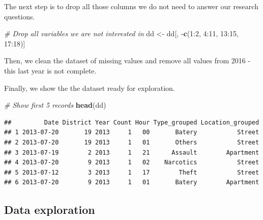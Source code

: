 \documentclass[]{article}
\newenvironment{Shaded}{\begin{snugshade}}{\end{snugshade}}
\newcommand{\KeywordTok}[1]{\textcolor[rgb]{0.13,0.29,0.53}{\textbf{{#1}}}}
\newcommand{\DecValTok}[1]{\textcolor[rgb]{0.00,0.00,0.81}{{#1}}}
\newcommand{\StringTok}[1]{\textcolor[rgb]{0.31,0.60,0.02}{{#1}}}
\newcommand{\CommentTok}[1]{\textcolor[rgb]{0.56,0.35,0.01}{\textit{{#1}}}}
\newcommand{\NormalTok}[1]{{#1}}
\begin{document}
The next step is to drop all those columns we do not need to answer our
research questions.

\begin{Shaded}
\begin{Highlighting}[]
\CommentTok{# Drop all variables we are not interested in}
\NormalTok{dd <-}\StringTok{ }\NormalTok{dd[, -}\KeywordTok{c}\NormalTok{(}\DecValTok{1}\NormalTok{:}\DecValTok{2}\NormalTok{, }\DecValTok{4}\NormalTok{:}\DecValTok{11}\NormalTok{, }\DecValTok{13}\NormalTok{:}\DecValTok{15}\NormalTok{, }\DecValTok{17}\NormalTok{:}\DecValTok{18}\NormalTok{)]}
\end{Highlighting}
\end{Shaded}

Then, we clean the dataset of missing values and remove all values from
2016 - this last year is not complete.

\begin{Shaded}
\end{Shaded}

Finally, we show the the dataset ready for exploration.

\begin{Shaded}
\begin{Highlighting}[]
\CommentTok{# Show first 5 records}
\KeywordTok{head}\NormalTok{(dd)}
\end{Highlighting}
\end{Shaded}

\begin{verbatim}
##         Date District Year Count Hour Type_grouped Location_grouped
## 1 2013-07-20       19 2013     1   00       Batery           Street
## 2 2013-07-20       19 2013     1   01       Others           Street
## 3 2013-07-19        2 2013     1   21      Assault        Apartment
## 4 2013-07-20        9 2013     1   02    Narcotics           Street
## 5 2013-07-12        3 2013     1   17        Theft           Street
## 6 2013-07-20        9 2013     1   01       Batery        Apartment
\end{verbatim}

\subsection{Data exploration}\label{data-exploration}
\end{document}
